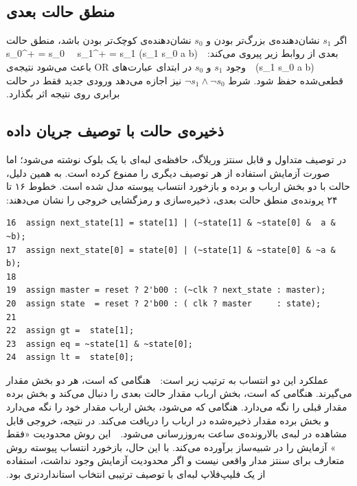 ‫
‫
‫\subsection{منطق حالت بعدی}
‫
‫اگر $s_1$ نشان‌دهنده‌ی بزرگ‌تر بودن و $s_0$ نشان‌دهنده‌ی کوچک‌تر بودن باشد، منطق حالت
‫بعدی از روابط زیر پیروی می‌کند:
‫
‫
‫s_1^{+} = s_1 \vee (\neg s_1 \wedge \neg s_0 \wedge a \wedge \neg b)
‫
‫
‫
‫s_0^{+} = s_0 \vee (\neg s_1 \wedge \neg s_0 \wedge \neg a \wedge b)
‫
‫
‫وجود $s_1$ و $s_0$ در ابتدای عبارت‌های OR باعث می‌شود نتیجه‌ی قطعی‌شده حفظ شود. شرط
‫$\neg s_1 \wedge \neg s_0$ نیز اجازه می‌دهد ورودی جدید فقط در حالت برابری روی نتیجه اثر
‫بگذارد.
‫
‫
‫\subsection{ذخیره‌ی حالت با توصیف جریان داده}
‫
‫در توصیف متداول و قابل سنتز وریلاگ، حافظه‌ی لبه‌ای با یک بلوک  نوشته می‌شود؛
‫اما صورت آزمایش استفاده از هر توصیف دیگری را ممنوع کرده است. به همین دلیل، حالت با دو
‫بخش ارباب و برده و بازخورد انتساب پیوسته مدل شده است. خطوط ۱۶ تا ۲۴ پرونده‌ی  منطق حالت بعدی، ذخیره‌سازی و رمزگشایی خروجی را نشان می‌دهند:
‫
\begin{dsdlcodeblock}
\begin{verbatim}
16  assign next_state[1] = state[1] | (~state[1] & ~state[0] &  a & ~b);
17  assign next_state[0] = state[0] | (~state[1] & ~state[0] & ~a &  b);
18
19  assign master = reset ? 2'b00 : (~clk ? next_state : master);
20  assign state  = reset ? 2'b00 : ( clk ? master     : state);
21
22  assign gt =  state[1];
23  assign eq = ~state[1] & ~state[0];
24  assign lt =  state[0];
\end{verbatim}
\end{dsdlcodeblock}
‫
‫عملکرد این دو انتساب به ترتیب زیر است:
‫
‫
‫ هنگامی که  است، هر دو بخش مقدار  می‌گیرند.
‫ هنگامی که  است، بخش ارباب مقدار حالت بعدی را دنبال می‌کند و بخش برده
‫مقدار قبلی را نگه می‌دارد.
‫ هنگامی که  می‌شود، بخش ارباب مقدار خود را نگه می‌دارد و بخش برده مقدار
‫ذخیره‌شده در ارباب را دریافت می‌کند.
‫ در نتیجه، خروجی قابل مشاهده در لبه‌ی بالارونده‌ی ساعت به‌روزرسانی می‌شود.
‫
‫
‫این روش محدودیت «فقط » آزمایش را در شبیه‌ساز  برآورده
‫می‌کند. با این حال، بازخورد انتساب پیوسته روش متعارف برای سنتز مدار واقعی نیست و اگر محدودیت
‫آزمایش وجود نداشت، استفاده از یک فلیپ‌فلاپ لبه‌ای با توصیف ترتیبی انتخاب استانداردتری بود.

